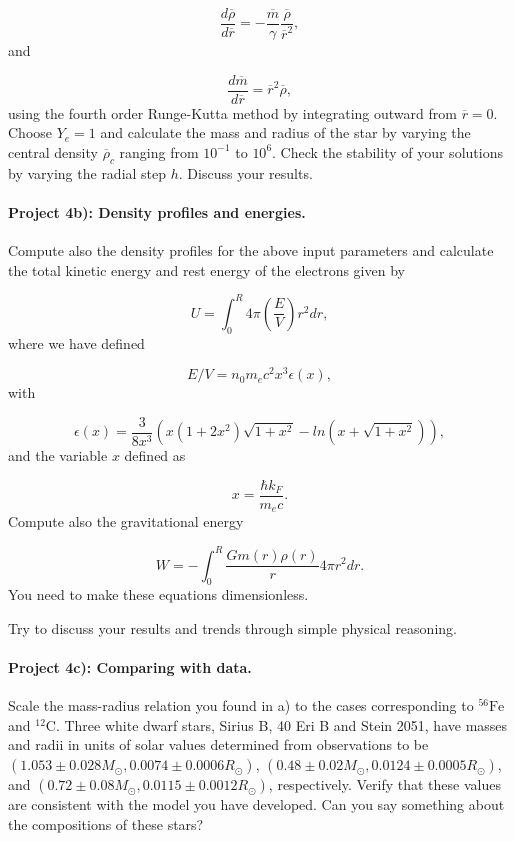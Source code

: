 \documentclass[%
oneside,                 %
final,                   %
10pt]{article}
\begin{document}
\begin{equation*}
\frac{d\overline{\rho}}{d\overline{r}}=-\frac{\overline{m}}{\gamma}\frac{\overline{\rho}}
{\overline{r}^{2}},
\end{equation*}
and

\begin{equation*}
\frac{d\overline{m}}{d\overline{r}}=
\overline{r}^{2}\overline{\rho},
\end{equation*}
using the fourth order Runge-Kutta method by integrating outward from $\overline{r}=0$.
Choose $Y_e=1$ and calculate the mass and radius of the star by varying the central density $\overline{\rho}_c$
ranging from $10^{-1}$ to $10^6$. 
Check the stability of your solutions by varying the radial step $h$. 
Discuss your results.

\paragraph{Project 4b): Density profiles and energies.}
Compute also the density profiles for the above input parameters and calculate the total kinetic energy and rest energy
of the electrons given by

\begin{equation*}
   U=\int_0^R4\pi \left( \frac{E}{V}\right )r^2dr,
\end{equation*}
where we have defined

\begin{equation*}
E/V=n_0m_ec^2x^3\epsilon (x),
\end{equation*}
with

\begin{equation*}
\epsilon (x) =
\frac{3}{8x^3}\left( x(1+2x^2)\sqrt{1+x^2}-ln(x+\sqrt{1+x^2})\right),
\end{equation*}
and the variable $x$ defined as

\begin{equation*}
x=\frac{\hbar k_F}{m_ec}.
\end{equation*}
Compute also the gravitational energy

\begin{equation*}
  W=-\int_0^R\frac{Gm(r)\rho(r)}{r}4\pi r^2dr.
\end{equation*}
You need to make these equations dimensionless. 

Try to discuss your results and trends through simple
physical reasoning.

\paragraph{Project 4c): Comparing with data.}
Scale the mass-radius relation you found in a) to the cases corresponding to $^{56}\mbox{Fe}$ and
$^{12}\mbox{C}$. Three white dwarf stars, Sirius B, 40 Eri B and Stein 2051, have masses and radii
in units of solar values determined from observations to be
$(1.053\pm0.028 M_{\odot},0.0074\pm 0.0006 R_{\odot})$, $(0.48\pm0.02 M_{\odot},0.0124\pm 0.0005 R_{\odot})$,
and $(0.72\pm0.08 M_{\odot},0.0115\pm 0.0012 R_{\odot})$, respectively.
Verify that these values are consistent with the model you have developed. Can you say something about the
compositions of these stars?
\end{document}
